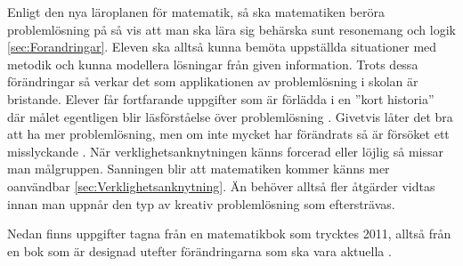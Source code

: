 \textcolor{WildStrawberry}{
    Enligt den nya läroplanen för matematik, så ska matematiken beröra problemlösning på så vis att man ska lära sig behärska sunt resonemang och logik \ref{sec:Forandringar}. Eleven ska alltså kunna bemöta uppställda situationer med metodik och kunna modellera lösningar från given information. Trots dessa förändringar så verkar det som applikationen av problemlösning i skolan är bristande. Elever får fortfarande uppgifter som är förlädda i en ''kort historia'' där målet egentligen blir läsförståelse över problemlösning . Givetvis låter det bra att ha mer problemlösning, men om inte mycket har förändrats så är försöket ett misslyckande . När verklighetsanknytningen känns forcerad eller löjlig så missar man målgruppen. Sanningen blir att matematiken kommer känns mer oanvändbar \ref{sec:Verklighetsanknytning}. Än behöver alltså fler åtgärder vidtas innan man uppnår den typ av kreativ problemlösning som eftersträvas.
}

\textcolor{WildStrawberry}{
    Nedan finns uppgifter tagna från en matematikbok som trycktes 2011, alltså från en bok som är designad utefter förändringarna som ska vara aktuella \cite{matte5000}.}




